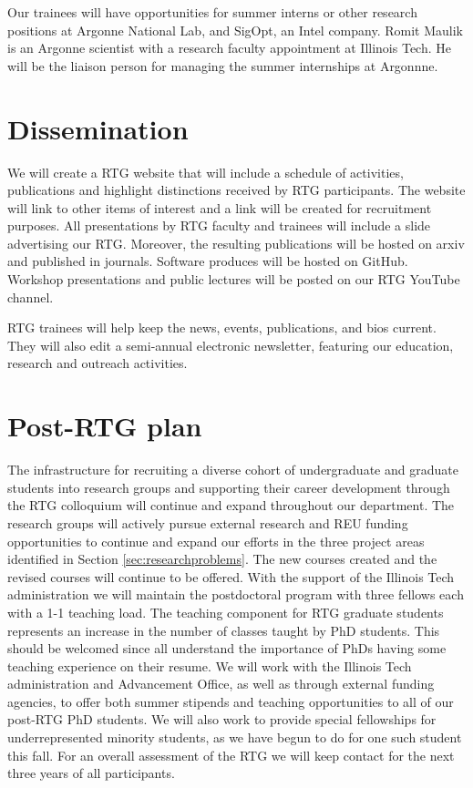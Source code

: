 \documentclass[11pt]{NSFamsart}
\begin{document}
Our trainees will have opportunities for summer interns or other research positions at Argonne National Lab, and  SigOpt, an Intel company. Romit Maulik is an Argonne scientist with a research faculty appointment at Illinois Tech.  He will be the liaison person for managing the summer internships at Argonnne. 

 \section{Dissemination} 
 We will create a   RTG website that will include a schedule of activities, publications and highlight
distinctions received by RTG participants. The website will link to other items of interest and a link will
be created for recruitment purposes. All presentations by RTG faculty and trainees  will    include a slide advertising our RTG.
Moreover, the resulting publications   will be hosted on arxiv and published in journals.  Software produces will be hosted on GitHub.  Workshop  presentations and  public lectures will be posted on our RTG YouTube channel.

 

RTG trainees will help keep the news, events, publications, and bios current.  They will also edit a semi-annual electronic newsletter, 
featuring our education, research  and outreach  activities. 

 
 \section{Post-RTG plan}
The infrastructure for recruiting a diverse cohort of undergraduate and graduate students into research groups and supporting their career development through the RTG colloquium will continue and expand throughout our department.  The research groups will actively pursue external research and REU funding opportunities to continue and expand our efforts in the three project areas identified in Section \ref{sec:researchproblems}. The new courses created and the revised courses will continue to be offered.
With the support of the Illinois Tech administration we will maintain the postdoctoral program with three
fellows each with a 1-1 teaching load. The teaching component for RTG graduate students represents
an increase in the number of classes taught by PhD students.  This should be welcomed since all  understand the importance of PhDs having some teaching experience on their resume.
We will work with the Illinois Tech administration and Advancement Office, as well as through external funding agencies,  to offer both summer stipends and teaching opportunities to all of our post-RTG PhD students.  We will also work to provide special fellowships for underrepresented minority students, as we have begun to do for one such student this fall.
For an overall assessment of the RTG we will keep contact for the next three years of all participants.
\end{document}
